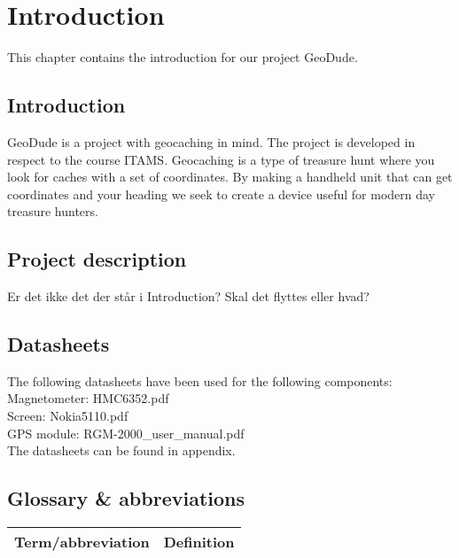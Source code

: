 \chapter{Introduction}
This chapter contains the introduction for our project GeoDude.


\section{Introduction}
GeoDude is a project with geocaching in mind. The project is developed in respect to the course ITAMS. Geocaching is a type of treasure hunt where you look for caches with a set of coordinates. By making a handheld unit that can get coordinates and your heading we seek to create a device useful for modern day treasure hunters. 

\section{Project description}
Er det ikke det der står i Introduction? Skal det flyttes eller hvad?

\section{Datasheets}
The following datasheets have been used for the following components:\\
Magnetometer: HMC6352.pdf\\
Screen: Nokia5110.pdf\\
GPS module: RGM-2000\_user\_manual.pdf\\

The datasheets can be found in appendix.

\section{Glossary \& abbreviations}
\begin{table}[H]
\centering
\begin{tabular}{|p{4cm}|p{7cm}|}
\hline
Term/abbreviation & Definition\\ \hline
\end{tabular}
\end{table}


